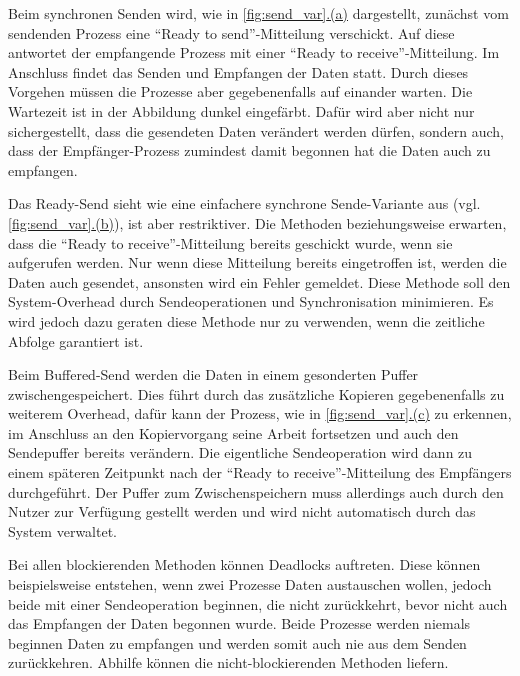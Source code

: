     Beim synchronen Senden wird, wie in \autoref{fig:send_var}\hyperref[fig:sync_send]{.(a)} dargestellt, zunächst vom sendenden Prozess eine ``Ready to send''-Mitteilung verschickt. Auf 
    diese antwortet der empfangende Prozess mit einer ``Ready to receive''-Mitteilung. Im Anschluss findet das Senden und Empfangen der Daten statt. Durch dieses Vorgehen müssen die Prozesse
    aber gegebenenfalls auf einander warten. Die Wartezeit ist in der Abbildung dunkel eingefärbt. Dafür wird aber nicht nur sichergestellt, dass die gesendeten Daten verändert werden dürfen,
    sondern auch, dass der Empfänger-Prozess zumindest damit begonnen hat die Daten auch zu empfangen. \citep{mpi_p2p, mpiv31}
    
    Das Ready-Send sieht wie eine einfachere synchrone Sende-Variante aus (vgl. \autoref{fig:send_var}\hyperref[fig:ready_send]{.(b)}), ist aber restriktiver. Die Methoden 
    beziehungsweise  erwarten, dass die ``Ready to receive''-Mitteilung bereits geschickt wurde, wenn sie aufgerufen werden. Nur wenn diese Mitteilung bereits eingetroffen
    ist, werden die Daten auch gesendet, ansonsten wird ein Fehler gemeldet. Diese Methode soll den System-Overhead durch Sendeoperationen und Synchronisation minimieren. Es wird jedoch 
    dazu geraten diese Methode nur zu verwenden, wenn die zeitliche Abfolge garantiert ist. \citep{mpi_p2p, mpiv31}
    
    Beim Buffered-Send werden die Daten in einem gesonderten Puffer zwischengespeichert. Dies führt durch das zusätzliche Kopieren gegebenenfalls zu weiterem Overhead, dafür kann der 
    Prozess, wie in \autoref{fig:send_var}\hyperref[fig:buff_send]{.(c)} zu erkennen, im Anschluss an den Kopiervorgang seine Arbeit fortsetzen und auch den Sendepuffer bereits verändern. 
    Die eigentliche Sendeoperation wird dann zu einem späteren Zeitpunkt nach der ``Ready to receive''-Mitteilung des Empfängers durchgeführt. Der Puffer zum Zwischenspeichern muss allerdings 
    auch durch den Nutzer zur Verfügung gestellt werden und wird nicht automatisch durch das System verwaltet. \citep{mpi_p2p, mpiv31}
    
    Bei allen blockierenden Methoden können Deadlocks auftreten. Diese können beispielsweise entstehen, wenn zwei Prozesse Daten austauschen wollen, jedoch beide mit einer Sendeoperation
    beginnen, die nicht zurückkehrt, bevor nicht auch das Empfangen der Daten begonnen wurde. Beide Prozesse werden niemals beginnen Daten zu empfangen und werden somit auch
    nie aus dem Senden zurückkehren. Abhilfe können die nicht-blockierenden Methoden liefern.
    

